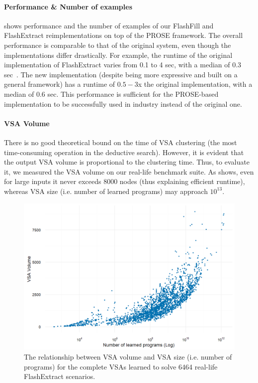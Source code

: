 \paragraph{Performance \& Number of examples}
 shows performance and the number of examples of our FlashFill and FlashExtract
reimplementations on top of the PROSE framework.
The overall performance is comparable to that of the original system, even though the implementations differ
drastically.
For example, the runtime of the original implementation of FlashExtract varies from 0.1 to 4 sec, with a median of 0.3
sec~\cite{flashextract}.
The new implementation (despite being more expressive and built on a general framework) has a runtime of
$0.5-3$x the original implementation, with a median of 0.6 sec.
This performance is sufficient for the PROSE-based implementation to be successfully used in industry instead of the
original one.

\paragraph{VSA Volume}
There is no good theoretical bound on the time of VSA clustering (the most time-consuming operation in the deductive
search).
However, it is evident that the output VSA volume is proportional to the clustering time.
Thus, to evaluate it, we measured the VSA volume on our real-life benchmark suite.
As  shows, even for large inputs it never exceeds $8000$ nodes (thus explaining
efficient runtime), whereas VSA size (i.e. number of learned programs) may approach $10^{13}$.

\begin{figure}[t]
    \centering
    \includegraphics[width=1.0\linewidth]{figures/vsa-volume}
    \uwsinglespace
    \caption{The relationship between VSA volume and VSA size (i.e. number of programs) for the complete VSAs learned to
    solve 6464 real-life FlashExtract scenarios.}
    \label{fig:prose:evaluation:volume}
\end{figure}
